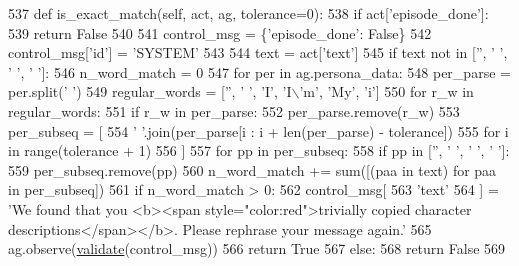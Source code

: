 \begin{DoxyCode}
537     \textcolor{keyword}{def }is\_exact\_match(self, act, ag, tolerance=0):
538         \textcolor{keywordflow}{if} act[\textcolor{stringliteral}{'episode\_done'}]:
539             \textcolor{keywordflow}{return} \textcolor{keyword}{False}
540 
541         control\_msg = \{\textcolor{stringliteral}{'episode\_done'}: \textcolor{keyword}{False}\}
542         control\_msg[\textcolor{stringliteral}{'id'}] = \textcolor{stringliteral}{'SYSTEM'}
543 
544         text = act[\textcolor{stringliteral}{'text'}]
545         \textcolor{keywordflow}{if} text \textcolor{keywordflow}{not} \textcolor{keywordflow}{in} [\textcolor{stringliteral}{''}, \textcolor{stringliteral}{' '}, \textcolor{stringliteral}{'  '}, \textcolor{stringliteral}{'   '}]:
546             n\_word\_match = 0
547             \textcolor{keywordflow}{for} per \textcolor{keywordflow}{in} ag.persona\_data:
548                 per\_parse = per.split(\textcolor{stringliteral}{' '})
549                 regular\_words = [\textcolor{stringliteral}{''}, \textcolor{stringliteral}{' '}, \textcolor{stringliteral}{'I'}, \textcolor{stringliteral}{'I\(\backslash\)'m'}, \textcolor{stringliteral}{'My'}, \textcolor{stringliteral}{'i'}]
550                 \textcolor{keywordflow}{for} r\_w \textcolor{keywordflow}{in} regular\_words:
551                     \textcolor{keywordflow}{if} r\_w \textcolor{keywordflow}{in} per\_parse:
552                         per\_parse.remove(r\_w)
553                 per\_subseq = [
554                     \textcolor{stringliteral}{' '}.join(per\_parse[i : i + len(per\_parse) - tolerance])
555                     \textcolor{keywordflow}{for} i \textcolor{keywordflow}{in} range(tolerance + 1)
556                 ]
557                 \textcolor{keywordflow}{for} pp \textcolor{keywordflow}{in} per\_subseq:
558                     \textcolor{keywordflow}{if} pp \textcolor{keywordflow}{in} [\textcolor{stringliteral}{''}, \textcolor{stringliteral}{' '}, \textcolor{stringliteral}{'  '}, \textcolor{stringliteral}{'   '}]:
559                         per\_subseq.remove(pp)
560                 n\_word\_match += sum([(paa \textcolor{keywordflow}{in} text) \textcolor{keywordflow}{for} paa \textcolor{keywordflow}{in} per\_subseq])
561             \textcolor{keywordflow}{if} n\_word\_match > 0:
562                 control\_msg[
563                     \textcolor{stringliteral}{'text'}
564                 ] = \textcolor{stringliteral}{'We found that you <b><span style="color:red">trivially copied character
       descriptions</span></b>. Please rephrase your message again.'}
565                 ag.observe(\hyperlink{namespaceparlai_1_1core_1_1worlds_afc3fad603b7bce41dbdc9cdc04a9c794}{validate}(control\_msg))
566                 \textcolor{keywordflow}{return} \textcolor{keyword}{True}
567             \textcolor{keywordflow}{else}:
568                 \textcolor{keywordflow}{return} \textcolor{keyword}{False}
569 
\end{DoxyCode}
